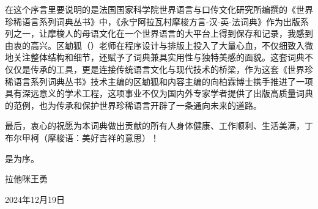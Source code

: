 在这个序言里要说明的是法国国家科学院世界语言与口传文化研究所编撰的《世界珍稀语言系列词典丛书》中，《永宁阿拉瓦村摩梭方言-汉-英-法词典》作为出版系列之一，让摩梭人的母语文化在一个世界语言的大平台上得到保存和记录，我感到由衷的高兴。区勄狐（）老师在程序设计与排版上投入了大量心血，不仅细致入微地关注整体结构和细节，还赋予了词典兼具实用性与独特美感的面貌。这套词典不仅仅是传承的工具，更是连接传统语言文化与现代技术的桥梁，作为这套《世界珍稀语言系列词典丛书》技术主编的区勄狐和内容主编的向柏霖博士携手推进了一项具有深远意义的学术工程，这项事业不仅为国内外专家学者提供了出版高质量词典的范例，也为传承和保护世界珍稀语言开辟了一条通向未来的道路。

\enlargethispage{2\baselineskip}

最后，衷心的祝愿为本词典做出贡献的所有人身体健康、工作顺利、生活美满，丁布尔甲柯（摩梭语：美好吉祥的意思）！

是为序。

{\raggedleft 拉他咪王勇\par}

{\raggedleft 2024年12月19日\par}
